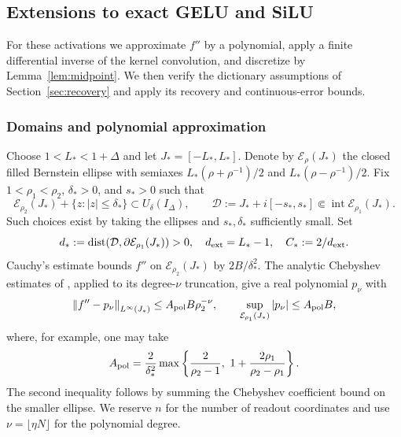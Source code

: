 \subsection{Extensions to exact GELU and SiLU}
\label{app:gelu-silu}
For these activations we approximate $f''$ by a polynomial, apply a finite
differential inverse of the kernel convolution, and discretize by
Lemma~\ref{lem:midpoint}. We then verify the dictionary assumptions of
Section~\ref{sec:recovery} and apply its recovery and continuous-error bounds.

\subsubsection{Domains and polynomial approximation}
Choose $1<L_*<1+\Delta$ and let $J_*=[-L_*,L_*]$. Denote by
$\mathcal E_\rho(J_*)$ the closed filled Bernstein ellipse with semiaxes
$L_*(\rho+\rho^{-1})/2$ and $L_*(\rho-\rho^{-1})/2$.
Fix $1<\rho_1<\rho_2$, $\delta_*>0$, and $s_*>0$ such that
\begin{equation}
 \mathcal E_{\rho_2}(J_*)+\{z:|z|\le\delta_*\}
 \subset U_\delta(I_\Delta),\qquad
 \mathcal D:=J_*+i[-s_*,s_*]\Subset\operatorname{int}\mathcal E_{\rho_1}(J_*).
 \label{eq:psi-domains}
\end{equation}
Such choices exist by taking the ellipses and $s_*,\delta_*$ sufficiently
small. Set
\begin{equation}
 d_*:=\operatorname{dist}(\mathcal D,\partial\mathcal E_{\rho_1}(J_*))>0,
 \quad d_{\rm ext}=L_*-1,\quad C_*:=2/d_{\rm ext}.
 \label{eq:psi-margins}
\end{equation}
Cauchy's estimate bounds $f''$ on $\mathcal E_{\rho_2}(J_*)$ by
$2B/\delta_*^2$. The analytic Chebyshev estimates of
\cite[Ch.~8]{trefethen2019atap}, applied to its degree-$\nu$ truncation,
give a real polynomial $p_\nu$ with
\begin{equation}
 \left\lVert f''-p_\nu\right\rVert_{L^\infty(J_*)}\le A_{\rm pol}B\rho_2^{-\nu},\qquad
 \sup_{\mathcal E_{\rho_1}(J_*)}|p_\nu|\le A_{\rm pol}B,
 \label{eq:psi-poly}
\end{equation}
where, for example, one may take
\begin{equation}
 A_{\rm pol}=\frac2{\delta_*^2}
 \max\left\{\frac2{\rho_2-1},\ 1+\frac{2\rho_1}{\rho_2-\rho_1}\right\}.
 \label{eq:Apol}
\end{equation}
The second inequality follows by summing the Chebyshev coefficient bound on
the smaller ellipse. We reserve $n$ for the number of readout coordinates
and use $\nu=\lfloor\eta N\rfloor$ for the polynomial degree.

